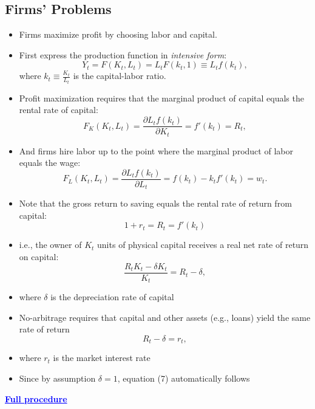 \documentclass[12pt]{article}
\begin{document}
\subsection*{\noindent\textbf{Firms’ Problems}}
\begin{itemize}
    \item Firms maximize profit by choosing labor and capital.
    
    \item First express the production function in \textit{intensive form}:
    \[
    Y_t = F(K_t, L_t) = L_t F(k_t, 1) \equiv L_t f(k_t),
    \]
    where $k_t \equiv \frac{K_t}{L_t}$ is the capital-labor ratio.

    \item Profit maximization requires that the marginal product of capital equals the rental rate of capital:
    \[
    F_K(K_t, L_t) = \frac{\partial L_t f(k_t)}{\partial K_t} = f'(k_t) = R_t, \tag{5}
    \]

    \item And firms hire labor up to the point where the marginal product of labor equals the wage:
    \[
    F_L(K_t, L_t) = \frac{\partial L_t f(k_t)}{\partial L_t} = f(k_t) - k_t f'(k_t) = w_t. \tag{6}
    \]

    \item Note that the gross return to saving equals the rental rate of return from capital:
    \[
    1 + r_t = R_t = f'(k_t) \tag{7}
    \]
\end{itemize}

\begin{itemize}
    \item i.e., the owner of $K_t$ units of physical capital receives a real net rate of return on capital:
    \[
    \frac{R_t K_t - \delta K_t}{K_t} = R_t - \delta,
    \]
    \item where $\delta$ is the depreciation rate of capital
    \item No-arbitrage requires that capital and other assets (e.g., loans) yield the same rate of return
    \[
    R_t - \delta = r_t,
    \]
    \item where $r_t$ is the market interest rate
    \item Since by assumption $\delta = 1$, equation (7) automatically follows
\end{itemize}


\textcolor{blue}{\textbf{\uline{Full procedure}}}
\end{document}
